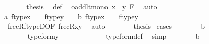 \begin{isabellebody}
\ \isanewline
\ \ \ \ \isamarkupfalse%
\ {\isacharquery}{\kern0pt}thesis\ \isamarkupfalse%
\ {\isasymGamma}{\isacharunderscore}{\kern0pt}def\ \isamarkupfalse%
\ oadd{\isacharunderscore}{\kern0pt}lt{\isacharunderscore}{\kern0pt}mono{}\ {\isacartoucheopen}{\isacharquery}{\kern0pt}x\ {\isacharless}{\kern0pt}\ {\isacharquery}{\kern0pt}y{\isacartoucheclose}\ F\ \isamarkupfalse%
\ auto\isanewline
\ \ \isamarkupfalse%
\isanewline
\ \ \ \ \isamarkupfalse%
\ {}\isanewline
\ \ \ \ \isamarkupfalse%
\ {\isacharparenleft}{\kern0pt}a{\isacharparenright}{\kern0pt}\ {\isachardoublequoteopen}ftype{\isacharparenleft}{\kern0pt}x{\isacharparenright}{\kern0pt}\ {\isacharequal}{\kern0pt}\ {}\ {\isasymand}\ ftype{\isacharparenleft}{\kern0pt}y{\isacharparenright}{\kern0pt}\ {\isacharequal}{\kern0pt}\ {}{\isachardoublequoteclose}\ {\isacharbar}{\kern0pt}\ {\isacharparenleft}{\kern0pt}b{\isacharparenright}{\kern0pt}\ {\isachardoublequoteopen}ftype{\isacharparenleft}{\kern0pt}x{\isacharparenright}{\kern0pt}\ {\isacharequal}{\kern0pt}\ {}\ {\isasymand}\ ftype{\isacharparenleft}{\kern0pt}y{\isacharparenright}{\kern0pt}\ {\isacharequal}{\kern0pt}\ {}{\isachardoublequoteclose}\isanewline
\ \ \ \ \ \ \isamarkupfalse%
\ \ frecR{\isacharunderscore}{\kern0pt}ftypeD{\isacharbrackleft}{\kern0pt}OF\ {\isacartoucheopen}frecR{\isacharparenleft}{\kern0pt}x{\isacharcomma}{\kern0pt}y{\isacharparenright}{\kern0pt}{\isacartoucheclose}{\isacharbrackright}{\kern0pt}\ \isamarkupfalse%
\ auto\isanewline
\ \ \ \ \isamarkupfalse%
\ \isamarkupfalse%
\ {\isacharquery}{\kern0pt}thesis\ \isamarkupfalse%
{\isacharparenleft}{\kern0pt}cases{\isacharparenright}{\kern0pt}\isanewline
\ \ \ \ \ \ \isamarkupfalse%
\ b\isanewline
\ \ \ \ \ \ \isamarkupfalse%
\ \isanewline
\ \ \ \ \ \ \isamarkupfalse%
\ {\isachardoublequoteopen}type{\isacharunderscore}{\kern0pt}form{\isacharparenleft}{\kern0pt}y{\isacharparenright}{\kern0pt}\ {\isacharequal}{\kern0pt}\ {}{\isachardoublequoteclose}\ \isanewline
\ \ \ \ \ \ \ \ \isamarkupfalse%
\ type{\isacharunderscore}{\kern0pt}form{\isacharunderscore}{\kern0pt}def\ \isamarkupfalse%
\ simp\isanewline
\ \ \ \ \ \ \isamarkupfalse%
\ b\isanewline
\ \ \ \ \ \ \isamarkupfalse%

\end{isabellebody}
